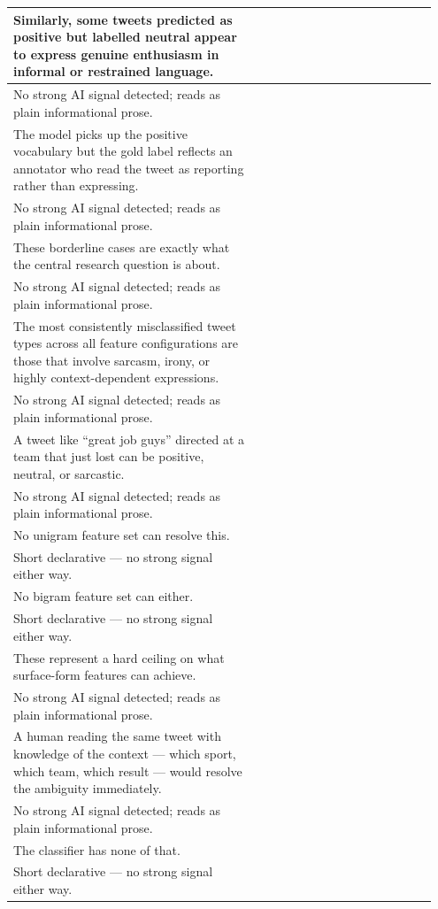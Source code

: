 \documentclass[11pt]{article}
\begin{document}
\begin{longtable}{|p{0.55\linewidth}|p{0.40\linewidth}|}
\hline
Similarly, some tweets predicted as positive but labelled neutral appear to express genuine enthusiasm in informal or restrained language. & \\[2pt]
\hline
No strong AI signal detected; reads as plain informational prose. & \\
\hline
The model picks up the positive vocabulary but the gold label reflects an annotator who read the tweet as reporting rather than expressing. & \\[2pt]
\hline
No strong AI signal detected; reads as plain informational prose. & \\
\hline
These borderline cases are exactly what the central research question is about. & \\[2pt]
\hline
No strong AI signal detected; reads as plain informational prose. & \\
\hline
The most consistently misclassified tweet types across all feature configurations are those that involve sarcasm, irony, or highly context-dependent expressions. & \\[2pt]
\hline
No strong AI signal detected; reads as plain informational prose. & \\
\hline
A tweet like ``great job guys'' directed at a team that just lost can be positive, neutral, or sarcastic. & \\[2pt]
\hline
No strong AI signal detected; reads as plain informational prose. & \\
\hline
No unigram feature set can resolve this. & \\[2pt]
\hline
Short declarative --- no strong signal either way. & \\
\hline
No bigram feature set can either. & \\[2pt]
\hline
Short declarative --- no strong signal either way. & \\
\hline
These represent a hard ceiling on what surface-form features can achieve. & \\[2pt]
\hline
No strong AI signal detected; reads as plain informational prose. & \\
\hline
A human reading the same tweet with knowledge of the context --- which sport, which team, which result --- would resolve the ambiguity immediately. & \\[2pt]
\hline
No strong AI signal detected; reads as plain informational prose. & \\
\hline
The classifier has none of that. & \\[2pt]
\hline
Short declarative --- no strong signal either way. & \\

\end{longtable}
\end{document}
